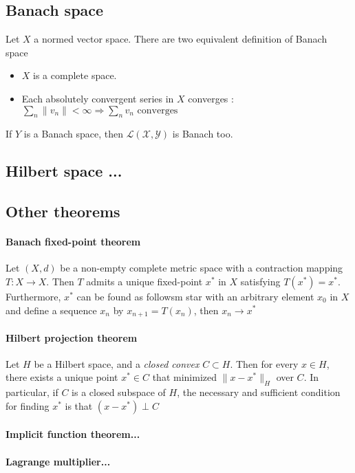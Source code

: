 \documentclass[a4paper,10pt]{article}
\begin{document}
\subsection{Banach space}
Let $X$ a normed vector space. There are two equivalent definition of Banach space
\begin{itemize}
 \item $X$ is a complete space.
 \item Each absolutely convergent series in $X$ converges : $\sum_n \|v_n\| < \infty \Longrightarrow \sum_n v_n \text{ converges }  $ 
\end{itemize}
If $Y$ is a Banach space, then $\mathcal{L(X,Y)}$ is Banach too.


\subsection{Hilbert space ...}%


\subsection{Other theorems}

\paragraph{Banach fixed-point theorem}
Let $(X,d)$ be a non-empty complete metric space with a contraction mapping $T:X\longrightarrow X$. Then $T$ admits a unique fixed-point $x^{*}$ in $X$ satisfying $T(x^{*}) = x^{*}$. Furthermore, $x^{*}$ can be found as followsm star with an arbitrary element $x_0$ in $X$ and define a sequence ${x_n}$ by $x_{n+1}=T(x_n)$, then $x_n \longrightarrow x^*$

\paragraph{Hilbert projection theorem} Let $H$ be a Hilbert space, and a \textit{closed convex} $C \subset H$. Then for every $x\in H$, there exists a unique point $x^{*}\in C$ that minimized $\|x-x^{*}\|_{H}$ over $C$. In particular, if $C$ is a closed subspace of $H$, the necessary and sufficient condition for finding $x^{*}$ is that $(x-x^{*}) \perp C$


\paragraph{Implicit function theorem...}%
\paragraph{Lagrange multiplier...}%
\end{document}
